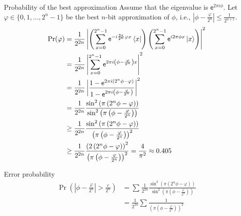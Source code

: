 \documentclass{beamer}
\newcommand\emm[1]{\textcolor{redorange}{{#1}}}
\begin{document}
\begin{frame}{Probability of the best approximation}
\small
Assume that the eigenvalue is $\mathsf{e}^{2\pi i\phi}$.
Let $\varphi\in\{0,1,\dotsc,2^n-1\}$ be the best $n$-bit approximation of $\phi$, i.e., \emm{$|\phi - \frac{\varphi}{2^n}|\le \frac1{2^{n+1}}$}.
\begin{align*}
\Pr(\varphi) &= \frac1{2^{2n}}\left|\left(\sum_{x=0}^{2^n-1} \mathsf{e}^{-i\frac{2\pi}{2^n}\varphi x}\bra{x}\right)\left(\sum_{x=0}^{2^n-1} \mathsf{e}^{i 2\pi\phi x}\ket{x}\right)\right|^2\\
&= \frac1{2^{2n}}\left|\sum_{x=0}^{2^n-1} \mathsf{e}^{2\pi i\left(\phi - \frac{\varphi}{2^n}\right) x}\right|^2\\
&= \frac1{2^{2n}}\left|\frac{1-\mathsf{e}^{2\pi i\left(2^n\phi - \varphi\right)}}{1-\mathsf{e}^{2\pi i\left(\phi - \frac{\varphi}{2^n}\right)}}\right|^2\\
&= \frac1{2^{2n}}\frac{\sin^2\left(\pi\left(2^n\phi - \varphi\right)\right)}{\sin^2\left(\pi\left(\phi - \frac{\varphi}{2^n}\right)\right)}\\
&\ge \frac1{2^{2n}}\frac{\sin^2\left(\pi\left(2^n\phi - \varphi\right)\right)}{\left(\pi\left(\phi - \frac{\varphi}{2^n}\right)\right)^2}\\
&\ge \frac1{2^{2n}}\frac{\left(2\left(2^n\phi - \varphi\right)\right)^2}{\left(\pi\left(\phi - \frac{\varphi}{2^n}\right)\right)^2}
= \frac{4}{\pi^2}\approx 0.405
\end{align*}
\end{frame}

\begin{frame}{Error probability}
\begin{align*}
\Pr\left(\left|\phi - \frac{\varphi}{2^n}\right| > \frac{c}{2^n}\right)
&=\sum_{} \frac1{2^{2n}}\frac{\sin^2\left(\pi\left(2^n\phi - \varphi\right)\right)}{\sin^2\left(\pi\left(\phi - \frac{\varphi}{2^n}\right)\right)}\\
&= \frac1{2^{2n}}\sum_{}\frac{1}{\left(\pi\left(\phi - \frac{\varphi}{2^n}\right)\right)^2}\\
\end{align*}
\end{frame}
\fi
\end{document}
